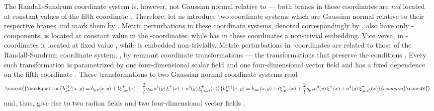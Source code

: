 \documentclass[a4paper,preprint,nofootinbib,
                 showpacs,preprintnumbers,amsmath,amssymb]{revtex4}
\begin{document}
The Randall-Sundrum coordinate system is, however, not 
Gaussian normal relative to \myHighlight{$\Sigma_\pm$}\coordHE{} --- both branes in these 
coordinates are {\em not} located at constant values of the fifth 
coordinate \coordHE{}. Therefore, let us introduce two coordinate systems 
which are Gaussian normal relative to their respective branes and 
mark them by \myHighlight{$(\pm)$}\coordHE{} \cite{ChGR}. Metric perturbations in these 
coordinate systems, denoted correspondingly by 
\coordHE{}, also have only \myHighlight{$\mu\nu$}\coordHE{}-components, 
\myHighlight{$\Sigma_+$}\coordHE{} is located at constant value \coordHE{} in the 
\myHighlight{$(+)$}\coordHE{}-coordinates, while \myHighlight{$\Sigma_-$}\coordHE{} has in these coordinates a 
non-trivial embedding. Vice versa, in \myHighlight{$(-)$}\coordHE{}-coordinates \myHighlight{$\Sigma_-$}\coordHE{} 
is located at fixed value \coordHE{}, while \myHighlight{$\Sigma_+$}\coordHE{} is embedded 
non-trivially. Metric perturbations \coordHE{} in 
\myHighlight{$(\pm)$}\coordHE{}-coordinates are related to those of the Randall-Sundrum 
coordinate system, \coordHE{}, by remnant coordinate 
transformations --- the transformations that preserve the 
conditions \coordHE{}. Every such transformation is 
parametrized by one four-dimensional scalar field \coordHE{} and one 
four-dimensional vector field \coordHE{} and has a fixed 
dependence on the fifth coordinate \cite{GT}. These 
transformations to two Gaussian normal coordinate systems read 
    \begin{equation}\coord{}\boxEquation{ 
    h^{(\pm)}_{\mu \nu}(x,y) 
    = h_{\mu \nu}(x,y)+ l \xi^\pm_{,\,\mu \nu}(x) 
    +\frac{2}{l} \eta_{\mu \nu} a^2(y)\,\xi^\pm(x) 
    +a^2(y)\,\xi^\pm_{(\mu,\nu)}(x)                \label{2.13} 
    }{ 
    h^{(\pm)}_{\mu \nu}(x,y) 
    = h_{\mu \nu}(x,y)+ l \xi^\pm_{,\,\mu \nu}(x) 
    +\frac{2}{l} \eta_{\mu \nu} a^2(y)\,\xi^\pm(x) 
    +a^2(y)\,\xi^\pm_{(\mu,\nu)}(x)                }{ecuacion}\coordE{}\end{equation} 
and, thus, give rise to two radion fields \coordHE{} and two 
four-dimensional vector fields \coordHE{}. 
 
\end{document}
